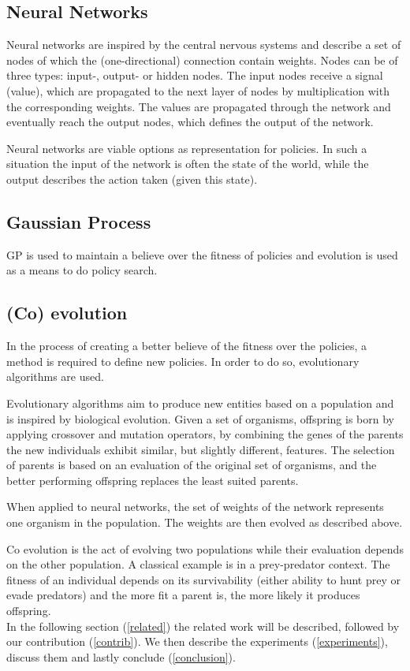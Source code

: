 \subsection{Neural Networks}
Neural networks are inspired by the central nervous systems and describe a set of nodes of which the (one-directional) connection contain weights. Nodes can be of three types: input-, output- or hidden nodes. The input nodes receive a signal (value), which are propagated to the next layer of nodes by multiplication with the corresponding weights. The values are propagated through the network and eventually reach the output nodes, which defines the output of the network. 

Neural networks are viable options as representation for policies. In such a situation the input of the network is often the state of the world, while the output describes the action taken (given this state).

\subsection{Gaussian Process}

GP is used to maintain a believe over the fitness of policies and evolution is used as a means to do policy search.

\subsection{(Co) evolution}
In the process of creating a better believe of the fitness over the policies, a method is required to define new policies. In order to do so, evolutionary algorithms are used. 

Evolutionary algorithms aim to produce new entities based on a population and is inspired by biological evolution. Given a set of organisms, offspring is born by applying crossover and mutation operators, by combining the genes of the parents the new individuals exhibit similar, but slightly different, features. The selection of parents is based on an evaluation of the original set of organisms, and the better performing offspring replaces the least suited parents. 

When applied to neural networks, the set of weights of the network represents one organism in the population. The weights are then evolved as described above.

Co evolution is the act of evolving two populations while their evaluation depends on the other population. A classical example is in a prey-predator context. The fitness of an individual depends on its survivability (either ability to hunt prey or evade predators) and the more fit a parent is, the more likely it produces offspring. \\

In the following section (\ref{related}) the related work will be described, followed by our contribution (\ref{contrib}). We then describe the experiments (\ref{experiments}), discuss them and lastly conclude (\ref{conclusion}).

